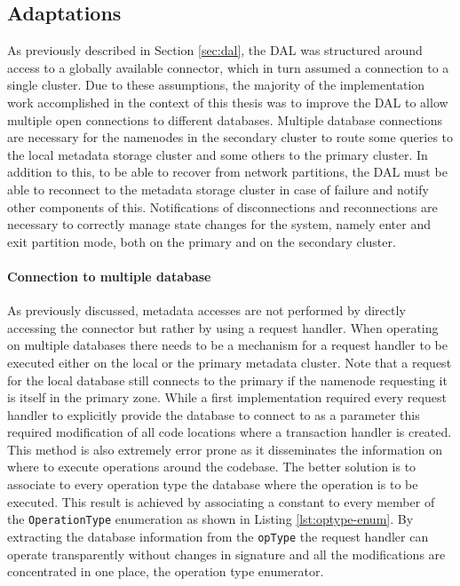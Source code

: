 \subsection{Adaptations}
As previously described in Section \ref{sec:dal}, the DAL was structured around access to a globally available connector, which in turn assumed a connection to a single cluster.
Due to these assumptions, the majority of the implementation work accomplished in the context of this thesis was to improve the DAL to allow multiple open connections to different databases.
Multiple database connections are necessary for the namenodes in the secondary cluster to route some queries to the local metadata storage cluster and some others to the primary cluster.
In addition to this, to be able to recover from network partitions, the DAL must be able to reconnect to the metadata storage cluster in case of failure and notify other components of this.
Notifications of disconnections and reconnections are necessary to correctly manage state changes for the system, namely enter and exit partition mode, both on the primary and on the secondary cluster.

\paragraph{Connection to multiple database}
As previously discussed, metadata accesses are not performed by directly accessing the connector but rather by using a request handler.
When operating on multiple databases there needs to be a mechanism for a request handler to be executed either on the local or the primary metadata cluster.
Note that a request for the local database still connects to the primary if the namenode requesting it is itself in the primary zone.
While a first implementation required every request handler to explicitly provide the database to connect to as a parameter this required modification of all code locations where a transaction handler is created.
This method is also extremely error prone as it disseminates the information on where to execute operations around the codebase.
The better solution is to associate to every operation type the database where the operation is to be executed.
This result is achieved by associating a constant to every member of the \texttt{OperationType} enumeration as shown in Listing \ref{lst:optype-enum}.
By extracting the database information from the \texttt{opType} the request handler can operate transparently without changes in signature and all the modifications are concentrated in one place, the operation type enumerator.


